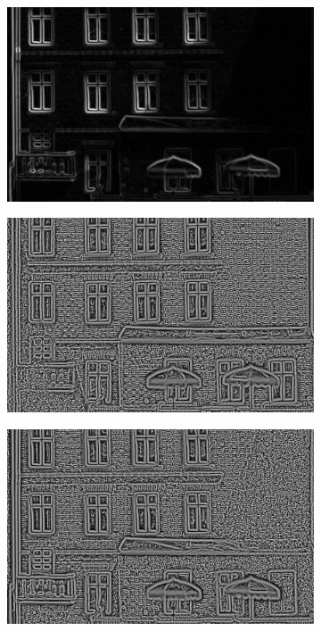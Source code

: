 \documentclass[thesis.tex]{subfiles}
\begin{document}
\begin{figure}[p]
\begin{subfigure}[t]{0.48\textwidth}
        \caption{}
        \label{fig:pixelNormalizationExample3}
    \end{subfigure}
    \begin{subfigure}[t]{0.48\textwidth}
        \includegraphics[width=\textwidth]{img/pixelNormalizationExample4.png}
        \caption{}
        \label{fig:pixelNormalizationExample4}
    \end{subfigure}
    \begin{subfigure}[t]{0.48\textwidth}
        \includegraphics[width=\textwidth]{img/pixelNormalizationExample5.png}
        \caption{}
        \label{fig:pixelNormalizationExample5}
    \end{subfigure}
    \begin{subfigure}[t]{0.48\textwidth}
        \includegraphics[width=\textwidth]{img/pixelNormalizationExample6.png}

\end{subfigure}
\end{figure}
\end{document}
